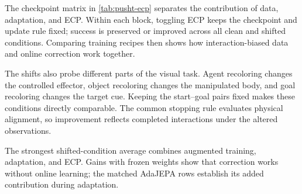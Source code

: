 The checkpoint matrix in \cref{tab:pusht-ecp} separates the contribution of data, adaptation, and ECP. Within each block, toggling ECP keeps the checkpoint and update rule fixed; success is preserved or improved across all clean and shifted conditions. Comparing training recipes then shows how interaction-biased data and online correction work together.

The shifts also probe different parts of the visual task. Agent recoloring changes the controlled effector, object recoloring changes the manipulated body, and goal recoloring changes the target cue. Keeping the start--goal pairs fixed makes these conditions directly comparable. The common stopping rule evaluates physical alignment, so improvement reflects completed interactions under the altered observations.

The strongest shifted-condition average combines augmented training, adaptation, and ECP. Gains with frozen weights show that correction works without online learning; the matched AdaJEPA rows establish its added contribution during adaptation.

